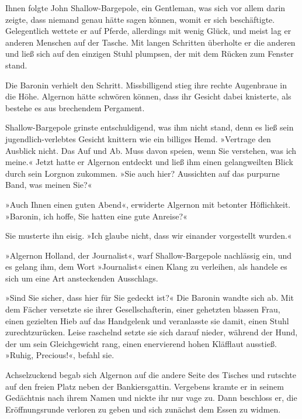 \bigpar

Ihnen folgte John Shallow-Bargepole, ein Gentleman, was sich vor
allem darin zeigte, dass niemand genau hätte sagen können, womit er
sich beschäftigte. Gelegentlich wettete er auf Pferde, allerdings
mit wenig Glück, und meist lag er anderen Menschen auf der Tasche.
Mit langen Schritten überholte er die anderen und ließ sich auf den
einzigen Stuhl plumpsen, der mit dem Rücken zum Fenster stand.

\bigpar

Die Baronin verhielt den Schritt. Missbilligend stieg ihre rechte
Augenbraue in die Höhe. Algernon hätte schwören können, dass ihr
Gesicht dabei knisterte, als bestehe es aus brechendem Pergament.

Shallow-Bargepole grinste entschuldigend, was ihm nicht stand, denn
es ließ sein jugendlich-verlebtes Gesicht knittern wie ein billiges
Hemd. »Vertrage den Ausblick nicht. Das Auf und Ab. Muss davon
speien, wenn Sie verstehen, was ich meine.« Jetzt hatte er Algernon
entdeckt und ließ ihm einen gelangweilten Blick durch sein Lorgnon
zukommen. »Sie auch hier? Aussichten auf das purpurne Band, was
meinen Sie?«

»Auch Ihnen einen guten Abend«, erwiderte Algernon mit betonter
Höflichkeit. »Baronin, ich hoffe, Sie hatten eine gute Anreise?«

Sie musterte ihn eisig. »Ich glaube nicht, dass wir einander
vorgestellt wurden.«

»Algernon Holland, der Journalist«, warf Shallow-Bargepole
nachlässig ein, und es gelang ihm, dem Wort »Journalist« einen
Klang zu verleihen, als handele es sich um eine Art ansteckenden
Ausschlags.

»Sind Sie sicher, dass hier für Sie gedeckt ist?« Die Baronin
wandte sich ab. Mit dem Fächer versetzte sie ihrer
Gesellschafterin, einer gehetzten blassen Frau, einen gezielten
Hieb auf das Handgelenk und veranlasste sie damit, einen Stuhl
zurechtzurücken. Leise raschelnd setzte sie sich darauf nieder,
während der Hund, der um sein Gleichgewicht rang, einen enervierend
hohen Kläfflaut ausstieß. »Ruhig, Precious!«, befahl sie.

Achselzuckend begab sich Algernon auf die andere Seite des Tisches
und rutschte auf den freien Platz neben der Bankiersgattin.
Vergebens kramte er in seinem Gedächtnis nach ihrem Namen und
nickte ihr nur vage zu. Dann beschloss er, die Eröffnungsrunde
verloren zu geben und sich zunächst dem Essen zu widmen.

\bigpar

